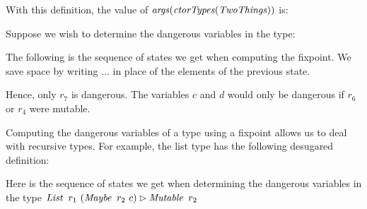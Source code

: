 With this definition, the value of $\operatorname{\mathit{args}}(\operatorname{\mathit{ctorTypes}}(\operatorname{\mathit{TwoThings}}))$ is:


Suppose we wish to determine the dangerous variables in the type:


The following is the sequence of states we get when computing the fixpoint. We save space by writing $...$ in place of the elements of the previous state.


Hence, only $r_7$ is dangerous. The variables $c$ and $d$ would only be dangerous if $r_6$ or $r_4$ were mutable.

Computing the dangerous variables of a type using a fixpoint allows us to deal with recursive types. For example, the list type has the following desugared definition:


Here is the sequence of states we get when determining the dangerous variables in the type $\operatorname{\mathit{List}} \ r_1 \ (\operatorname{\mathit{Maybe}} \ r_2 \ c) \rhd \operatorname{\mathit{Mutable}} \ r_2$

\medskip
{}

